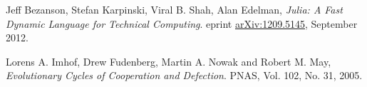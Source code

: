 \documentclass[a4paper,11pt]{article}
\begin{document}
\begin{thebibliography}{9}

        Jeff Bezanson, Stefan Karpinski, Viral B. Shah, Alan Edelman,
        \emph{Julia: A Fast Dynamic Language for Technical Computing}.
        eprint \href{http://arxiv.org/pdf/1209.5145v1.pdf}{arXiv:1209.5145},
        September 2012.

        Lorens A. Imhof, Drew Fudenberg, Martin A. Nowak and Robert M. May,
        \emph{Evolutionary Cycles of Cooperation and Defection}.
        PNAS,
        Vol. 102,
        No. 31, 
        2005.

\end{thebibliography}
\end{document}
